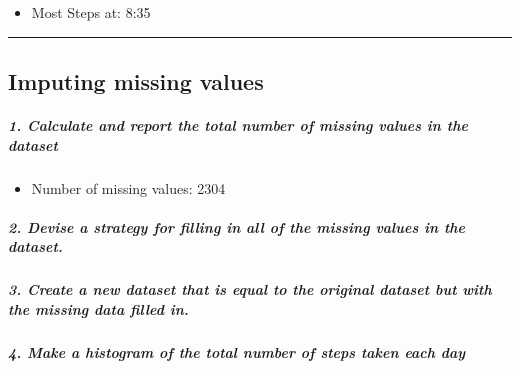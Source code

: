 \documentclass[]{article}
\newenvironment{Shaded}{\begin{snugshade}}{\end{snugshade}}
\newcommand{\KeywordTok}[1]{\textcolor[rgb]{0.13,0.29,0.53}{\textbf{#1}}}
\newcommand{\DataTypeTok}[1]{\textcolor[rgb]{0.13,0.29,0.53}{#1}}
\newcommand{\StringTok}[1]{\textcolor[rgb]{0.31,0.60,0.02}{#1}}
\newcommand{\OperatorTok}[1]{\textcolor[rgb]{0.81,0.36,0.00}{\textbf{#1}}}
\newcommand{\NormalTok}[1]{#1}
\providecommand{\tightlist}{%
  \setlength{\itemsep}{0pt}\setlength{\parskip}{0pt}}
\let\oldsubparagraph\subparagraph
\renewcommand{\subparagraph}[1]{\oldsubparagraph{#1}\mbox{}}
\begin{document}
\begin{itemize}
\tightlist
\item
  Most Steps at: 8:35
\end{itemize}

\begin{center}\rule{0.5\linewidth}{\linethickness}\end{center}

\subsection{Imputing missing values}\label{imputing-missing-values}

\subparagraph{1. Calculate and report the total number of missing values
in the
dataset}\label{calculate-and-report-the-total-number-of-missing-values-in-the-dataset}

\begin{Shaded}
\end{Shaded}

\begin{itemize}
\tightlist
\item
  Number of missing values: 2304
\end{itemize}

\subparagraph{2. Devise a strategy for filling in all of the missing
values in the
dataset.}\label{devise-a-strategy-for-filling-in-all-of-the-missing-values-in-the-dataset.}

\subparagraph{3. Create a new dataset that is equal to the original
dataset but with the missing data filled
in.}\label{create-a-new-dataset-that-is-equal-to-the-original-dataset-but-with-the-missing-data-filled-in.}

\begin{Shaded}
\end{Shaded}

\subparagraph{4. Make a histogram of the total number of steps taken
each
day}\label{make-a-histogram-of-the-total-number-of-steps-taken-each-day}
\end{document}
